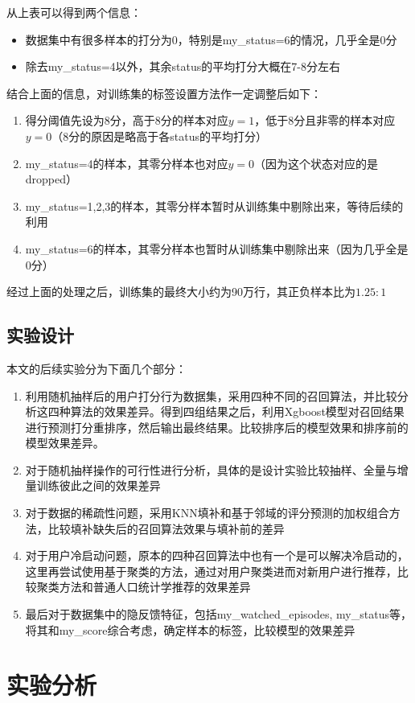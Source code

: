 \documentclass{article}
\begin{document}
	从上表可以得到两个信息：
	\begin{itemize}
		\item 数据集中有很多样本的打分为0，特别是my\_status=6的情况，几乎全是0分
		\item 除去my\_status=4以外，其余status的平均打分大概在7-8分左右
	\end{itemize}

	结合上面的信息，对训练集的标签设置方法作一定调整后如下：
	\begin{enumerate}
		\item 得分阈值先设为8分，高于8分的样本对应$y=1$，低于8分且非零的样本对应$y=0$（8分的原因是略高于各status的平均打分）
		\item my\_status=4的样本，其零分样本也对应$y=0$（因为这个状态对应的是dropped）
		\item my\_status=1,2,3的样本，其零分样本暂时从训练集中剔除出来，等待后续的利用
		\item my\_status=6的样本，其零分样本也暂时从训练集中剔除出来（因为几乎全是0分）
	\end{enumerate}

	经过上面的处理之后，训练集的最终大小约为90万行，其正负样本比为$1.25:1$

	\subsection{实验设计}
	本文的后续实验分为下面几个部分：
	\begin{enumerate}
		\item 利用随机抽样后的用户打分行为数据集，采用四种不同的召回算法，并比较分析这四种算法的效果差异。得到四组结果之后，利用Xgboost模型对召回结果进行预测打分重排序，然后输出最终结果。比较排序后的模型效果和排序前的模型效果差异。
		\item 对于随机抽样操作的可行性进行分析，具体的是设计实验比较抽样、全量与增量训练彼此之间的效果差异
		\item 对于数据的稀疏性问题，采用KNN填补和基于邻域的评分预测的加权组合方法，比较填补缺失后的召回算法效果与填补前的差异
		\item 对于用户冷启动问题，原本的四种召回算法中也有一个是可以解决冷启动的，这里再尝试使用基于聚类的方法，通过对用户聚类进而对新用户进行推荐，比较聚类方法和普通人口统计学推荐的效果差异
		\item 最后对于数据集中的隐反馈特征，包括my\_watched\_episodes, my\_status等，将其和my\_score综合考虑，确定样本的标签，比较模型的效果差异
	\end{enumerate}

\section{实验分析}
\end{document}
